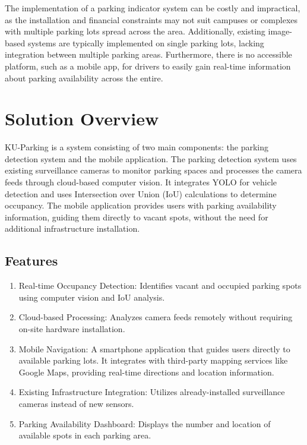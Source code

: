 The implementation of a parking indicator system can be costly and impractical, as the installation and financial constraints may not suit campuses or complexes with multiple parking lots spread across the area. Additionally, existing image-based systems are typically implemented on single parking lots, lacking integration between multiple parking areas. Furthermore, there is no accessible platform, such as a mobile app, for drivers to easily gain real-time information about parking availability across the entire.

\section{Solution Overview}
\label{section:solution-overview}

KU-Parking is a system consisting of two main components: the parking detection system and the mobile application. The parking detection system uses existing surveillance cameras to monitor parking spaces and processes the camera feeds through cloud-based computer vision. It integrates YOLO for vehicle detection and uses Intersection over Union (IoU) calculations to determine occupancy. The mobile application provides users with parking availability information, guiding them directly to vacant spots, without the need for additional infrastructure installation.

\subsection{Features}
\label{subsection:features}

\begin{enumerate}[leftmargin=80pt]
    \item Real-time Occupancy Detection: Identifies vacant and occupied parking spots using computer vision and IoU analysis.
    \item Cloud-based Processing: Analyzes camera feeds remotely without requiring on-site hardware installation.
    \item Mobile Navigation: A smartphone application that guides users directly to available parking lots. It integrates with third-party mapping services like Google Maps, providing real-time directions and location information.
    \item Existing Infrastructure Integration: Utilizes already-installed surveillance cameras instead of new sensors.
    \item Parking Availability Dashboard: Displays the number and location of available spots in each parking area.
    \end{enumerate}

